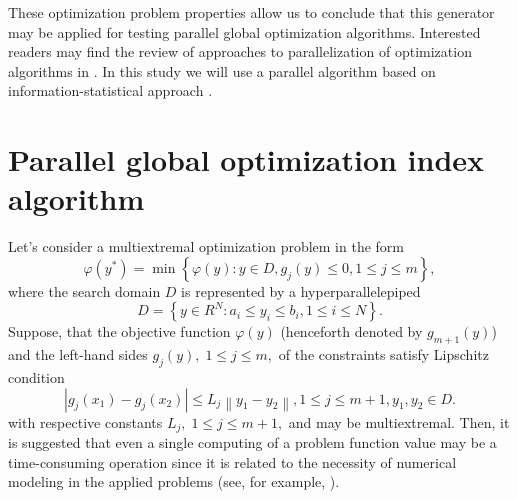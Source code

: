 \documentclass{llncs}
\begin{document}
These optimization problem properties allow us to conclude that this generator may be applied for testing parallel global optimization algorithms. 
Interested readers may find the review of approaches to parallelization of optimization algorithms in \cite{Pardalos1992}. In this study we will use a parallel algorithm based on information-statistical approach \cite{Strongin2000,Sergeyev2013}.

\section{Parallel global optimization index algorithm}

Let's consider a multiextremal optimization problem in the form
\begin{equation}\label{Eq:11}
\varphi(y^\ast)=\min{\left\{\varphi(y): y\in D, g_j(y)\leq 0, 1\leq j\leq m\right\}},
\end{equation}
where the search domain $D$ is represented by a hyperparallelepiped
\begin{equation}\label{Eq:12}
D={\left\{y\in R^N: a_i\leq y_i\leq b_i, 1\leq i\leq N\right\}}.
\end{equation}
Suppose, that the objective function $\varphi(y)$ (henceforth denoted by $g_{m+1}(y)$) and the left-hand sides $g_j(y), \; 1\leq j \leq m,$ of the constraints satisfy Lipschitz condition 
\[
\left|g_j(x_1)-g_j(x_2)\right|\leq L_j\left\|y_1-y_2\right\|, 1\leq j \leq m+1, y_1,y_2\in D.
\]
with respective constants $L_j, \; 1 \leq j \leq m+1,$ and may be multiextremal.
Then, it is suggested that even a single computing of a problem function value may be a time-consuming operation since it is related to the necessity of numerical modeling in the applied problems (see, for example, \cite{Grishagin2015,Modorskii}).
\end{document}
